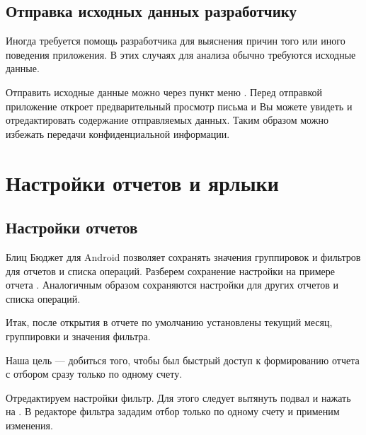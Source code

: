 \documentclass[a4paper,10pt,russian]{sphinxmanual}
\begin{document}
\section{Отправка исходных данных разработчику}
\label{\detokenize{bulk-actions:id8}}
Иногда требуется помощь разработчика для выяснения причин того или иного поведения приложения. В этих
случаях для анализа обычно требуются исходные данные.

Отправить исходные данные можно через пункт меню . Перед отправкой
приложение откроет предварительный просмотр письма и Вы можете увидеть и отредактировать содержание
отправляемых данных. Таким образом можно избежать передачи конфиденциальной информации.

\noindent{}
\noindent{}


\chapter{Настройки отчетов и ярлыки}
\label{\detokenize{shortcuts:chapter-shortcuts}}\label{\detokenize{shortcuts:id1}}\label{\detokenize{shortcuts::doc}}

\section{Настройки отчетов}
\label{\detokenize{shortcuts:id2}}
Блиц Бюджет для Android позволяет сохранять значения группировок и фильтров для отчетов и списка операций. Разберем
сохранение настройки на примере отчета . Аналогичным образом сохраняются настройки
для других отчетов и списка операций.

Итак, после открытия в отчете по умолчанию установлены текущий месяц, группировки и значения фильтра.

\noindent{}
\noindent{}
\noindent{}

Наша цель — добиться того, чтобы был быстрый доступ к формированию отчета  с отбором
сразу только по одному счету.

Отредактируем настройки фильтр. Для этого следует вытянуть подвал и нажать на .
В редакторе фильтра зададим отбор только по одному счету и применим изменения.
\end{document}
